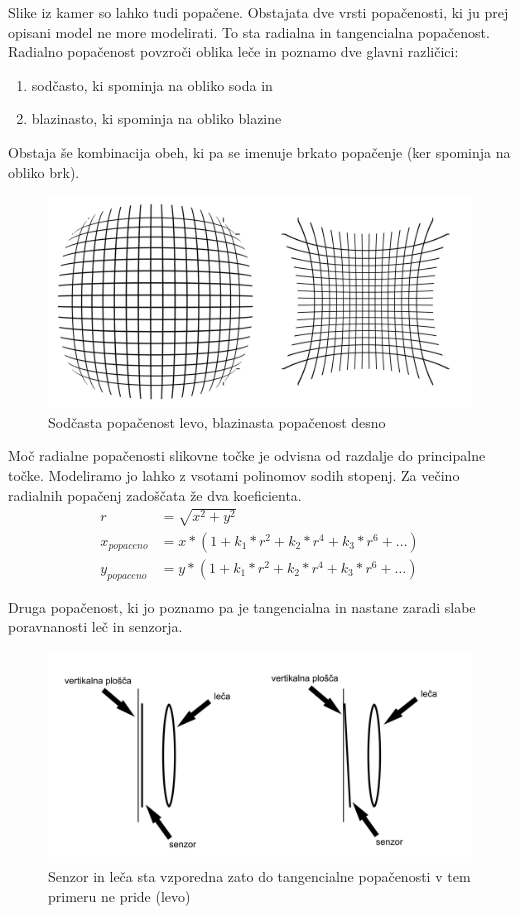 \documentclass[a4paper, 12pt]{book}
\begin{document}
Slike iz kamer so lahko tudi popačene. Obstajata dve vrsti popačenosti, ki ju prej opisani model ne more modelirati. To sta radialna in tangencialna popačenost. Radialno popačenost povzroči oblika leče in poznamo dve glavni različici:
\begin{enumerate}
\item sodčasto, ki spominja na obliko soda in
\item blazinasto, ki spominja na obliko blazine
\end{enumerate}
Obstaja še kombinacija obeh, ki pa se imenuje brkato popačenje (ker spominja na obliko brk).

\begin{figure}[H]
\centering
\includegraphics[width=\textwidth,height=\textheight,keepaspectratio]{distorsion.png}
\caption{Sodčasta popačenost levo, blazinasta popačenost desno}
\end{figure}

Moč radialne popačenosti slikovne točke je odvisna od razdalje do principalne točke. Modeliramo jo lahko z vsotami polinomov sodih stopenj. Za večino radialnih popačenj zadoščata že dva koeficienta. 
\begin{align}
\label{radialdisteq}
r &= \sqrt{x^2 + y^2} \\ 
x_{popaceno} &= x * (1 + k_1*r^2 + k_2*r^4 + k_3*r^6 + \dots) \\
y_{popaceno} &= y * (1 + k_1*r^2 + k_2*r^4 + k_3*r^6 + \dots)
\end{align}

Druga popačenost, ki jo poznamo pa je tangencialna in nastane zaradi slabe poravnanosti leč in senzorja.

\begin{figure}[H]
\centering
\includegraphics[width=\textwidth,height=\textheight,keepaspectratio]{tangential.png}
\caption{Senzor in leča sta vzporedna zato do tangencialne popačenosti v tem primeru ne pride (levo)}
\end{figure}
\end{document}
